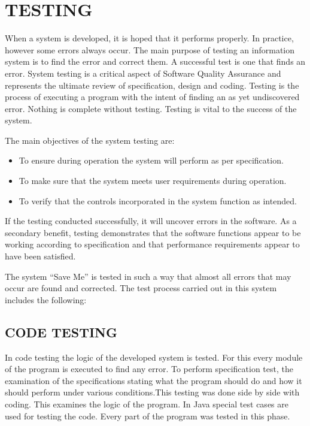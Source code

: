 \documentclass[12pt,a4paper,oneside]{report}
\begin{document}
{\chapter{TESTING}
\par When a system is developed, it is hoped that it performs properly. In practice, however some errors always occur. The main purpose of testing an information system is to find the error and correct them. A successful test is one that finds an error. System testing is a critical aspect of Software Quality Assurance and represents the ultimate review of specification, design and coding. Testing is the process of executing a program with the intent of finding an as yet undiscovered error. Nothing is complete without testing. Testing is vital to the success of the system.\\
\par The main objectives of the system testing are:\\
\begin{itemize}
\item To ensure during operation the system will perform as per specification. 
\item To make sure that the system meets user requirements during operation.
\item To verify that the controls incorporated in the system function as intended.
\end{itemize}
\par If the testing conducted successfully, it will uncover errors in the software. As a secondary benefit, testing demonstrates that the software functions appear to be working according to specification and that performance requirements appear to have been satisfied.\\
\par The system “Save Me” is tested in such a way that almost all errors that may occur are found and corrected. The test process carried out in this system includes the following:\\
\section{CODE TESTING}
\par In code testing the logic of the developed system is tested. For this every module of the program is executed to find any error. To perform specification test, the examination of the specifications stating what the program should do and how it should perform under various conditions.This testing was done side by side with coding. This examines the logic of the program. In Java special test cases are used for testing the code. Every part of the program was tested in this phase.

}
\end{document}
